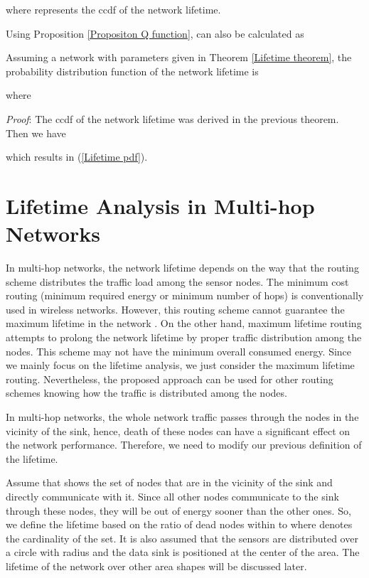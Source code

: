 \documentclass[conference]{IEEEtran}
\begin{document}
where  represents the ccdf of the network lifetime.
\hfill 

\prop \label{Proposition mu Q function} Using Proposition
\ref{Propositon Q function},  can also be calculated as
\hfill 

\corol \label{Corollary lifetime PDF} Assuming a network with
parameters given in Theorem \ref{Lifetime theorem}, the probability
distribution function of the network lifetime is

where

\textit{Proof}: The ccdf of the network lifetime was derived in the
previous theorem. Then we have

which results in (\ref{Lifetime pdf}). \hfill 


\section{Lifetime Analysis in Multi-hop Networks} \label{Section lifetime pdf multi-hop}
In multi-hop networks, the network lifetime depends on the way that
the routing scheme distributes the traffic load among the sensor
nodes. The minimum cost routing (minimum required energy or minimum
number of hops) is conventionally used in wireless networks.
However, this routing scheme cannot guarantee the maximum lifetime
in the network \cite{Al-Karaki_Routing_Magazine2004}. On the other
hand, maximum lifetime routing attempts to prolong the network
lifetime by proper traffic distribution among the nodes. This scheme
may not have the minimum overall consumed energy. Since we mainly
focus on the lifetime analysis, we just consider the maximum
lifetime routing. Nevertheless, the proposed approach can be used for other routing schemes knowing how the traffic is distributed among the nodes.

In multi-hop networks, the whole network traffic passes through the
nodes in the vicinity of the sink, hence, death of these nodes can
have a significant effect on the network performance. Therefore, we
need to modify our previous definition of the lifetime.

Assume that  shows the set of nodes that are in the
vicinity of the sink and directly communicate with it. Since all
other nodes communicate to the sink through these nodes, they will
be out of energy sooner than the other ones. So, we define the
lifetime based on the ratio of dead nodes within  to  where  denotes the cardinality
of the set. It is also assumed that the sensors are distributed over
a circle with radius  and the data sink is positioned at the
center of the area. The lifetime of the network over other area
shapes will be discussed later.
\end{document}

